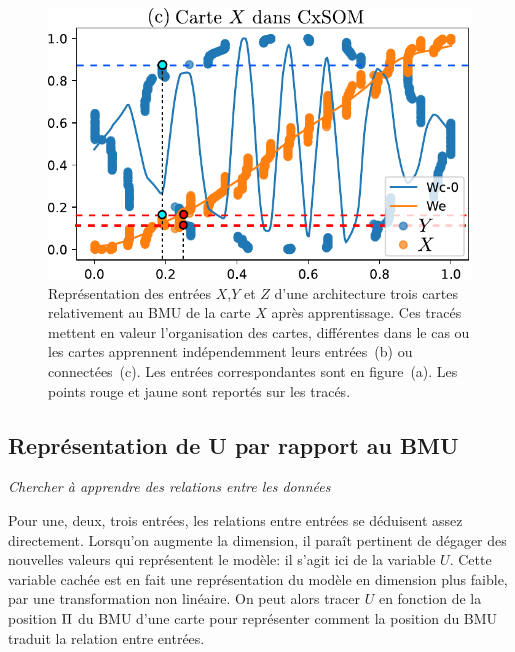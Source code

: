 \begin{figure}
\begin{minipage}{0.34\textwidth}
\end{minipage}
\begin{minipage}{0.38\textwidth}
\includegraphics[width=\textwidth]{weights_2som.pdf}
\end{minipage}
\label{fig:inputs}
\caption{Représentation des entrées $X$,$Y$ et $Z$ d'une architecture trois cartes relativement au BMU de la carte $X$ après apprentissage. Ces tracés mettent en valeur l'organisation des cartes, différentes dans le cas ou les cartes apprennent indépendemment leurs entrées~(b) ou connectées~(c). Les entrées correspondantes sont en figure~(a). Les points rouge et jaune sont reportés sur les tracés.}
\end{figure}

\subsection{Représentation de U par rapport au BMU}
\emph{Chercher à apprendre des relations entre les données}

Pour une, deux, trois entrées, les relations entre entrées se déduisent assez directement. Lorsqu'on augmente la dimension, il paraît pertinent de dégager des nouvelles valeurs qui représentent le modèle: il s'agit ici de la variable $U$. Cette variable cachée est en fait une représentation du modèle en dimension plus faible, par une transformation non linéaire. On peut alors tracer $U$ en fonction de la position $\Pi$ du BMU d'une carte pour représenter comment la position du BMU traduit la relation entre entrées.

